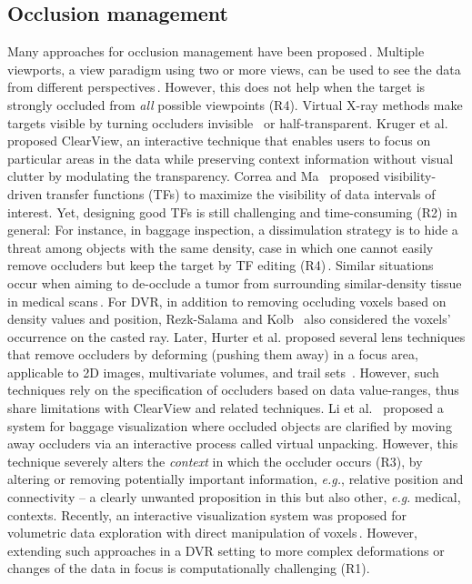 \subsection{Occlusion management}
%
Many approaches for occlusion management have been proposed\,\cite{4483791}. Multiple viewports, a view paradigm using two or more views, can be used to see the data from different perspectives\,\cite{WangBaldonado:2000:GUM:345513.345271}. However, this does not help when the target is strongly occluded from \emph{all} possible viewpoints (R4). Virtual X-ray methods make targets visible by turning occluders invisible~\cite{Burns:2008:ACC:1457515.1409107} or half-transparent. Kruger et al.~\cite{4015450} proposed ClearView, an interactive technique that enables users to focus on particular areas in the data while preserving context information without visual clutter by modulating the transparency. Correa and Ma~\cite{5416704} proposed visibility-driven transfer functions (TFs) to maximize the visibility of data intervals of interest. Yet, designing good TFs is still challenging and time-consuming (R2) in general: For instance, in baggage inspection, a dissimulation strategy is to hide a threat among objects with the same density, case in which one cannot easily remove occluders but keep the target by TF editing (R4)\,\cite{7819413}. Similar situations occur when aiming to de-occlude a tumor from surrounding similar-density tissue in medical scans\,\cite{CGF:CGF12927}. For DVR, in addition to removing occluding voxels based on density values and position, Rezk-Salama and Kolb~\cite{CGF:CGF979} also considered the voxels' occurrence on the casted ray. Later, Hurter et al. proposed several lens techniques that remove occluders by deforming (pushing them away) in a focus area, applicable to 2D images, multivariate volumes, and trail sets~\cite{moleview,6787171}. However, such techniques rely on the specification of occluders based on data value-ranges, thus share limitations with ClearView and related techniques. Li et al.~\cite{Li:2012:LVV:2425296.2425325} proposed a system for baggage visualization where occluded objects are clarified by moving away occluders via an interactive process called virtual unpacking. However, this technique severely alters the \emph{context} in which the occluder occurs (R3), by altering or removing potentially important information, \emph{e.g.}, relative position and connectivity -- a clearly unwanted proposition in this but also other, \emph{e.g.} medical, contexts. Recently, an interactive visualization system was proposed for volumetric data exploration with direct manipulation of voxels\,\cite{7819413}. However, extending such approaches in a DVR setting to more complex deformations or changes of the data in focus is computationally challenging (R1).

